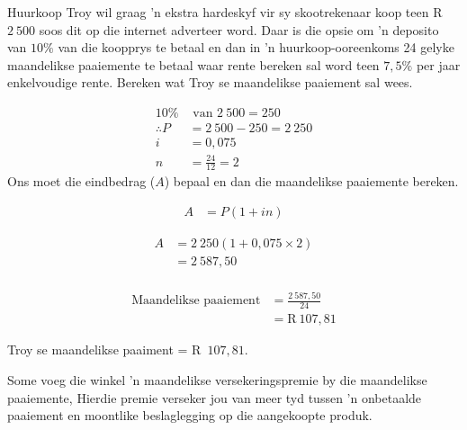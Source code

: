 \begin{wex}{Huurkoop}
{Troy wil graag ’n ekstra hardeskyf vir sy
skootrekenaar koop teen R~$2~500$ soos dit op die internet adverteer word.
Daar is die opsie om ’n deposito van $10\%$ van die koopprys te betaal
en dan in ’n huurkoop-ooreenkoms 24 gelyke maandelikse paaiemente
te betaal waar rente bereken sal word teen $7,5\%$ per jaar enkelvoudige
rente. Bereken wat Troy se maandelikse paaiement sal wees.}
{

\begin{align*}
      10\% &\mbox{ van } 2~500= 250\\
      \therefore P &= 2~500-250 =2~250\\
      i &= 0,075\\
      n &= \frac{24}{12} =2
    \end{align*}
    Ons moet die eindbedrag ($A$) bepaal en dan die maandelikse
paaiemente bereken.

    \begin{align*}
	    A &= P(1 + in)
    \end{align*}

    \begin{align*}
	A &= 2~250(1 + 0,075 \times 2)\\
	  &= 2~587,50\\
    \end{align*}

    \begin{align*}
	\mbox{Maandelikse paaiement} &= \frac{2~587,50}{24}\\
			&= \mbox{R}~107,81
    \end{align*}

    Troy se maandelikse paaiment = R~$107,81$.
}
\end{wex}


Some voeg die winkel 'n maandelikse versekeringspremie by die maandelikse paaiemente, Hierdie premie verseker jou van meer tyd tussen 'n onbetaalde paaiement en moontlike beslaglegging op die aangekoopte produk.


